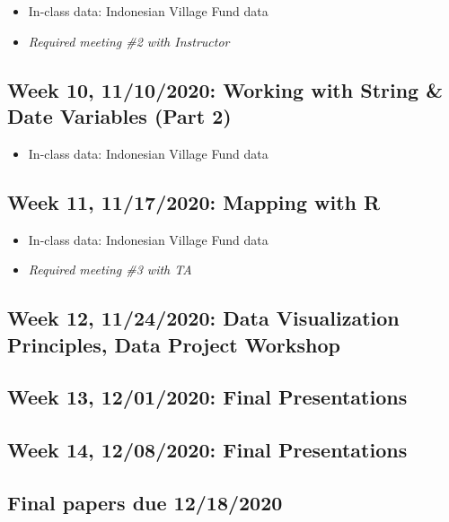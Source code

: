 \documentclass[11pt,]{article}
\providecommand{\tightlist}{%
  \setlength{\itemsep}{0pt}\setlength{\parskip}{0pt}}
\begin{document}
\begin{itemize}
\tightlist
\item
  In-class data: Indonesian Village Fund data
\item
  \emph{Required meeting \#2 with Instructor}
\end{itemize}

\medskip

\hypertarget{week-10-11102020-working-with-string-date-variables-part-2}{%
\subsection{Week 10, 11/10/2020: Working with String \& Date Variables
(Part
2)}\label{week-10-11102020-working-with-string-date-variables-part-2}}

\begin{itemize}
\tightlist
\item
  In-class data: Indonesian Village Fund data \medskip
\end{itemize}

\hypertarget{week-11-11172020-mapping-with-r}{%
\subsection{Week 11, 11/17/2020: Mapping with
R}\label{week-11-11172020-mapping-with-r}}

\begin{itemize}
\tightlist
\item
  In-class data: Indonesian Village Fund data
\item
  \emph{Required meeting \#3 with TA} \medskip
\end{itemize}

\hypertarget{week-12-11242020-data-visualization-principles-data-project-workshop}{%
\subsection{Week 12, 11/24/2020: Data Visualization Principles, Data
Project
Workshop}\label{week-12-11242020-data-visualization-principles-data-project-workshop}}

\medskip

\hypertarget{week-13-12012020-final-presentations}{%
\subsection{Week 13, 12/01/2020: Final
Presentations}\label{week-13-12012020-final-presentations}}

\medskip

\hypertarget{week-14-12082020-final-presentations}{%
\subsection{Week 14, 12/08/2020: Final
Presentations}\label{week-14-12082020-final-presentations}}

\medskip

\hypertarget{final-papers-due-12182020}{%
\subsection{Final papers due
12/18/2020}\label{final-papers-due-12182020}}
\end{document}

